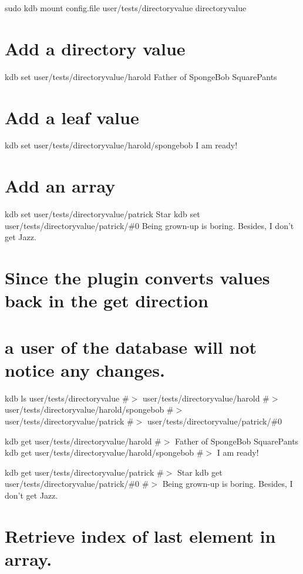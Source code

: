 sudo kdb mount config.\+file user/tests/directoryvalue directoryvalue

\section*{Add a directory value}

kdb set user/tests/directoryvalue/harold \textquotesingle{}Father of Sponge\+Bob Square\+Pants\textquotesingle{} \section*{Add a leaf value}

kdb set user/tests/directoryvalue/harold/spongebob \textquotesingle{}I am ready!\textquotesingle{}

\section*{Add an array}

kdb set user/tests/directoryvalue/patrick Star kdb set user/tests/directoryvalue/patrick/\#0 \textquotesingle{}Being grown-\/up is boring. Besides, I don’t get Jazz.\textquotesingle{}

\section*{Since the plugin converts values back in the get direction}

\section*{a user of the database will not notice any changes.}

kdb ls user/tests/directoryvalue \#$>$ user/tests/directoryvalue/harold \#$>$ user/tests/directoryvalue/harold/spongebob \#$>$ user/tests/directoryvalue/patrick \#$>$ user/tests/directoryvalue/patrick/\#0

kdb get user/tests/directoryvalue/harold \#$>$ Father of Sponge\+Bob Square\+Pants kdb get user/tests/directoryvalue/harold/spongebob \#$>$ I am ready!

kdb get user/tests/directoryvalue/patrick \#$>$ Star kdb get user/tests/directoryvalue/patrick/\#0 \#$>$ Being grown-\/up is boring. Besides, I don’t get Jazz.

\section*{Retrieve index of last element in array.}

